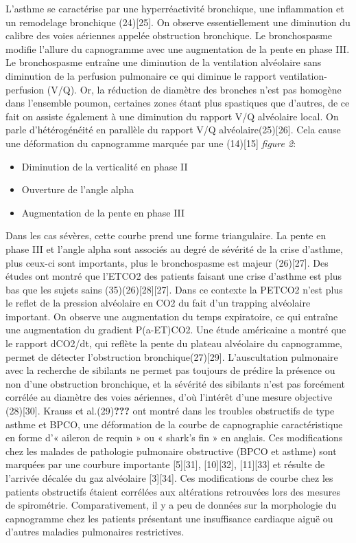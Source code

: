 \documentclass[12pt,]{article}
\providecommand{\tightlist}{%
  \setlength{\itemsep}{0pt}\setlength{\parskip}{0pt}}
\begin{document}
L'asthme se caractérise par une hyperréactivité bronchique, une
inflammation et un remodelage bronchique (24){[}25{]}. On observe
essentiellement une diminution du calibre des voies aériennes appelée
obstruction bronchique. Le bronchospasme modifie l'allure du capnogramme
avec une augmentation de la pente en phase III. Le bronchospasme
entraîne une diminution de la ventilation alvéolaire sans diminution de
la perfusion pulmonaire ce qui diminue le rapport ventilation-perfusion
(V/Q). Or, la réduction de diamètre des bronches n'est pas homogène dans
l'ensemble poumon, certaines zones étant plus spastiques que d'autres,
de ce fait on assiste également à une diminution du rapport V/Q
alvéolaire local. On parle d'hétérogénéité en parallèle du rapport V/Q
alvéolaire(25){[}26{]}. Cela cause une déformation du capnogramme
marquée par une (14){[}15{]} \emph{figure 2}:

\begin{itemize}
\tightlist
\item
  Diminution de la verticalité en phase II
\item
  Ouverture de l'angle alpha
\item
  Augmentation de la pente en phase III
\end{itemize}

Dans les cas sévères, cette courbe prend une forme triangulaire. La
pente en phase III et l'angle alpha sont associés au degré de sévérité
de la crise d'asthme, plus ceux-ci sont importants, plus le
bronchospasme est majeur (26){[}27{]}. Des études ont montré que l'ETCO2
des patients faisant une crise d'asthme est plus bas que les sujets
sains (35)(26){[}28{]}{[}27{]}. Dans ce contexte la PETCO2 n'est plus le
reflet de la pression alvéolaire en CO2 du fait d'un trapping alvéolaire
important. On observe une augmentation du temps expiratoire, ce qui
entraîne une augmentation du gradient P(a-ET)CO2. Une étude américaine a
montré que le rapport dCO2/dt, qui reflète la pente du plateau
alvéolaire du capnogramme, permet de détecter l'obstruction
bronchique(27){[}29{]}. L'auscultation pulmonaire avec la recherche de
sibilants ne permet pas toujours de prédire la présence ou non d'une
obstruction bronchique, et la sévérité des sibilants n'est pas forcément
corrélée au diamètre des voies aériennes, d'où l'intérêt d'une mesure
objective (28){[}30{]}. Krauss et al.(29){\textbf{???}} ont montré dans
les troubles obstructifs de type asthme et BPCO, une déformation de la
courbe de capnographie caractéristique en forme d'« aileron de requin »
ou « shark's fin » en anglais. Ces modifications chez les malades de
pathologie pulmonaire obstructive (BPCO et asthme) sont marquées par une
courbure importante {[}5{]}{[}31{]}, {[}10{]}{[}32{]}, {[}11{]}{[}33{]}
et résulte de l'arrivée décalée du gaz alvéolaire {[}3{]}{[}34{]}. Ces
modifications de courbe chez les patients obstructifs étaient corrélées
aux altérations retrouvées lors des mesures de spirométrie.
Comparativement, il y a peu de données sur la morphologie du capnogramme
chez les patients présentant une insuffisance cardiaque aiguë ou
d'autres maladies pulmonaires restrictives.
\end{document}
